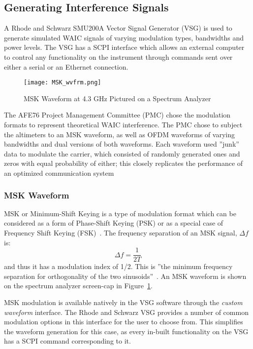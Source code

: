 \subsection{Generating Interference Signals}\label{sub:Generating}
A Rhode and Schwarz SMU200A Vector Signal Generator (VSG) is used to generate simulated WAIC signals of varying modulation types, bandwidths and power levels. The VSG has a SCPI interface which allows an external computer to control any functionality on the instrument through commands sent over either a serial or an Ethernet connection. 
\begin{figure}[ht]
\centering
\texttt{[image: MSK\_wvfrm.png]}
\caption[]{MSK Waveform at 4.3 GHz Pictured on a Spectrum Analyzer}

\label{fig:MSK}

\end{figure}

The AFE76 Project Management Committee (PMC) chose the modulation formats to represent theoretical WAIC interference. The PMC chose to subject the altimeters to an MSK waveform, as well as OFDM waveforms of varying bandwidths and dual versions of both waveforms. Each waveform used ''junk'' data to modulate the carrier, which consisted of randomly generated ones and zeros with equal probability of either; this closely replicates the performance of an optimized communication system~\cite{unknown}
\subsubsection{MSK Waveform}\label{subsub:MSK}
MSK or Minimum-Shift Keying is a type of modulation format which can be considered as a form of Phase-Shift Keying (PSK) or as a special case of Frequency Shift Keying (FSK)~\cite{proakis_communication_2002}. The frequency separation of an MSK signal, $\Delta f$ is: $$ \Delta f = \frac{1}{2T}$$
and thus it has a modulation index of 1/2. This is ''the minimum frequency separation for orthogonality of the two sinusoids''~\cite{proakis_communication_2002}. An MSK waveform is shown on the spectrum analyzer screen-cap in Figure~\ref{fig:MSK}.

MSK modulation is available natively in the VSG software through the \textit{custom waveform} interface.  The Rhode and Schwarz VSG provides a number of common modulation options in this interface for the user to choose from. This simplifies the waveform generation for this case, as every in-built functionality on the VSG has a SCPI command corresponding to it. 



